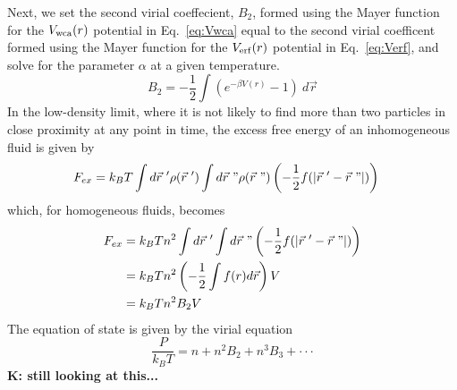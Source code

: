 \documentclass[letterpaper,twocolumn,amsmath,amssymb,prb]{revtex4-1}
\newcommand\davidsays[1]{{\bf \color{blue}D: #1}}
\newcommand\kirstiesays[1]{{\bf \color{red}K: #1}}
\begin{document}
Next, we set the second virial coeffecient, $B_2$, formed using the Mayer 
function for the $V_{\mathrm{wca}}(r)$ potential 
in Eq.~\ref{eq:Vwca} equal to the second virial coefficent formed using 
the Mayer function for the $V_{\mathrm{erf}}(r)$ potential in Eq.~\ref{eq:Verf}, 
and solve for the parameter $\alpha$ at a given temperature.
\begin{equation}B_2=-\frac{1}{2}\int{(e^{-\beta V(r)} - 1)~d{\vec{r}}}\end{equation}
In the low-density limit, where it is not likely to find more than two
particles in close proximity at any point in time, 
the excess free energy of an inhomogeneous fluid is given by
\begin{align}\label{eq:Fexcess_low-density_homogeneous}
    F_{ex} &= k_BT\int d\vec {r}~'\rho(\vec r~')\int d\vec {r}~"\rho(\vec r~")\left(-\frac{1}{2}f(|\vec {r}~'-\vec {r}~"|)\right) 
\end{align} 
which, for homogeneous fluids, becomes
\begin{align}\label{eq:Fexcess_low-density_inhomogeneous}
    F_{ex} &= k_BTn^2\int d\vec {r}~'\int d\vec {r}~"\left(-\frac{1}{2}f(|\vec {r}~'-\vec {r}~"|)\right) \\
               &= k_BTn^2\left(-\frac{1}{2}\int{f(r)}{d\vec{r}}\right)V \\
               &= k_BTn^2 B_2 V
\end{align} 
The equation of state  is given by the virial equation 
\begin{equation}\frac{P}{k_BT}=n+n^2B_2+n^3B_3+ \cdot\cdot\cdot \end{equation}
\kirstiesays{still looking at this...}
\end{document}
